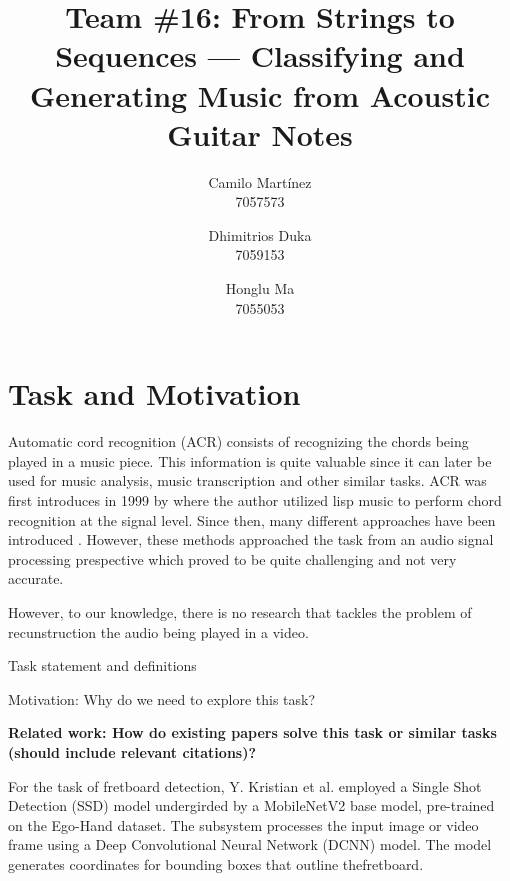 \documentclass[10pt,twocolumn,letterpaper]{article}
\begin{document}
\title{Team \#16: From Strings to Sequences --- Classifying and Generating Music from Acoustic Guitar Notes}

\author{
Camilo Martínez\\
7057573\\
\and
Dhimitrios Duka\\
7059153\\
\and
Honglu Ma\\
7055053\\
}
\maketitle

\section{Task and Motivation}
Automatic cord recognition (ACR) consists of recognizing the chords being played in a music piece. This information is quite valuable since it can later be used for music analysis, music transcription and other similar tasks. ACR was first introduces in 1999 by \cite{takuya1999realtime} where the author utilized lisp music to perform chord recognition at the signal level. Since then, many different approaches have been introduced \cite{}. However, these methods approached the task from an audio signal processing prespective which proved to be quite challenging and not very accurate. 



However, to our knowledge, there is no research that tackles the problem of recunstruction the audio being played in a video. 

Task statement and definitions

Motivation: Why do we need to explore this task?

\textbf{Related work: How do existing papers solve this task or similar tasks (should include relevant citations)?}

For the task of fretboard detection, Y. Kristian et al. \cite[2024]{Kristian_Zaman_Tenoyo_Jodhinata_2024} employed a Single Shot Detection (SSD) model undergirded by a MobileNetV2 base model, pre-trained on the Ego-Hand dataset. The subsystem processes the input image or video frame using a Deep Convolutional Neural Network (DCNN) model. The model generates coordinates for bounding boxes that outline thefretboard.
\end{document}

